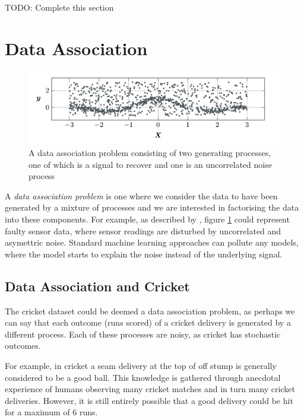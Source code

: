\documentclass[12pt,a4paper]{report}
\theoremstyle{definition}
\begin{document}
TODO: Complete this section

\section{Data Association}

\begin{figure}[H]
    \centering
    \includegraphics[width=\linewidth]{data_association_problem.png}
    \caption{A data association problem consisting of two generating processes, one of which is a signal to recover and one is an uncorrelated noise process \citep{Kaiser2018}}
    \label{fig:DataAssocProblem}
\end{figure}

A \emph{data association problem} is one where we consider the data to have been generated by a mixture of processes and we are interested in factorising the data into these components. 
For example, as described by \citet{Kaiser2018}, figure \ref{fig:DataAssocProblem} could represent faulty sensor data, where sensor readings are disturbed by uncorrelated and asymettric noise. 
Standard machine learning approaches can pollute any models, where the model starts to explain the noise instead of the underlying signal. 

\subsection{Data Association and Cricket}

The cricket dataset could be deemed a data association problem, as perhaps we can say that each outcome (runs scored) of a cricket delivery is generated by a different process. 
Each of these processes are noisy, as cricket has stochastic outcomes. 

For example, in cricket a seam delivery at the top of off stump is generally considered to be a good ball. 
This knowledge is gathered through anecdotal experience of humans observing many cricket matches and in turn many cricket deliveries.
However, it is still entirely possible that a good delivery could be hit for a maximum of 6 runs. 
\end{document}
